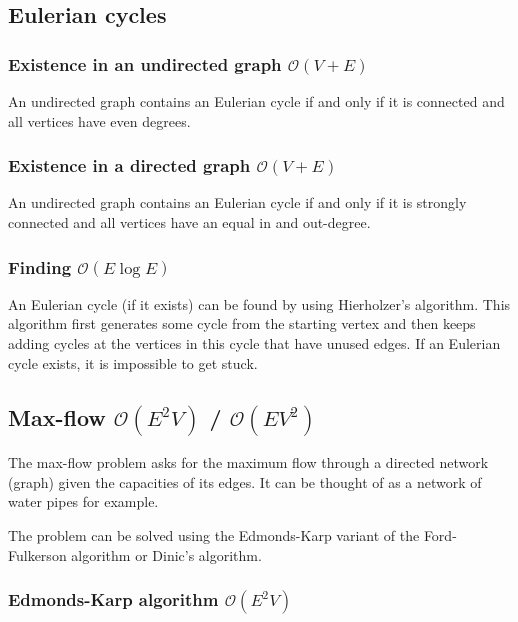 \subsection{Eulerian cycles}

\subsubsection{Existence in an undirected graph $\mathcal O(V + E)$}
An undirected graph contains an Eulerian cycle if and only if it is connected and all vertices have even degrees.

\subsubsection{Existence in a directed graph $\mathcal O(V + E)$}
An undirected graph contains an Eulerian cycle if and only if it is strongly connected and all vertices have an equal in and out-degree.

\subsubsection{Finding $\mathcal O(E\log E)$}
An Eulerian cycle (if it exists) can be found by using Hierholzer's algorithm. This algorithm first generates some cycle from the starting vertex and then keeps adding cycles at the vertices in this cycle that have unused edges. If an Eulerian cycle exists, it is impossible to get stuck.



\subsection{Max-flow $\mathcal O(E^2V)$ / $\mathcal O(EV^2)$}

The max-flow problem asks for the maximum flow through a directed network (graph) given the capacities of its edges. It can be thought of as a network of water pipes for example.

The problem can be solved using the Edmonds-Karp variant of the Ford-Fulkerson algorithm or Dinic's algorithm.

\subsubsection{Edmonds-Karp algorithm $\mathcal O(E^2V)$}

